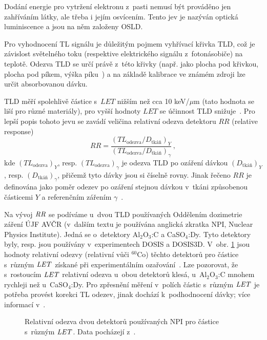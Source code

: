 Dodání energie pro vytržení elektronu z~pasti nemusí být prováděno jen zahříváním látky, ale třeba i jejím osvícením. Tento jev je nazýván optická luminiscence a jsou na něm založeny OSLD.

Pro vyhodnocení TL signálu je důležitým pojmem vyhřívací křivka TLD, což je závislost světelného toku (respektive elektrického signálu z~fotonásobiče) na teplotě. Odezva TLD se určí právě z~této křivky (např. jako plocha pod křivkou, plocha pod píkem, výška píku~\cite{dosis}) a na základě kalibrace ve známém zdroji lze určit absorbovanou dávku.

TLD měří spolehlivě částice s~$\mathit{LET}$ nižším než cca 10 keV/$\mu$m (tato hodnota se liší pro různé materiály), pro vyšší hodnoty $\mathit{LET}$ se účinnost TLD snižuje~\cite{passDetectors}. Pro lepší popis tohoto jevu se zavádí veličina relativní odezva detektoru $\mathit{RR}$ (relative response)
\begin{equation}
  \mathit{RR}=\frac{\left(TL_{\text{odezva}}/D_{\text{tkáň}}\right)_Y}{\left(TL_{\text{odezva}}/D_{\text{tkáň}}\right)_{\gamma}}\,,
  \label{eq:detektory_TLD_RR}
\end{equation}
kde $(TL_{\text{odezva}})_Y$, resp. $(TL_{\text{odezva}})_{\gamma}$ je odezva TLD po ozáření dávkou $(D_{\text{tkáň}})_Y$, resp. $(D_{\text{tkáň}})_{\gamma}$, přičemž tyto dávky jsou si číselně rovny. Jinak řečeno $\mathit{RR}$ je definována jako poměr odezev po ozáření stejnou dávkou v~tkáni způsobenou částicemi $Y$ a referenčním zářením $\gamma$~\cite{TLD_RR}. 

Na vývoj $\mathit{RR}$ se podíváme u~dvou TLD používaných Oddělením dozimetrie záření ÚJF AVČR (v~dalším textu je používána anglická zkratka NPI, Nuclear Physics Institute). Jedná se o~detektory Al$_2$O$_3$:C a CaSO$_4$:Dy. Tyto detektory byly, resp. jsou používány v~experimentech DOSIS a DOSIS3D. V~obr. \ref{fig:detektory_TLD_RR} jsou hodnoty relativní odezvy (relativní vůči $^{60}$Co) těchto detektorů pro částice s~různým $\mathit{LET}$ získané při experimentálním ozařování~\cite{dataTLD_RR}. Lze pozorovat, že s~rostoucím $\mathit{LET}$ relativní odezva u~obou detektorů klesá, u~Al$_2$O$_3$:C mnohem rychleji než u~CaSO$_4$:Dy. Pro zpřesnění měření v~polích částic s~různým $\mathit{LET}$ je potřeba provést korekci TL odezev, jinak dochází k~podhodnocení dávky; více informací v~\cite{TLD_RR}.
\begin{figure}[H]
  \centering
  
  \caption{Relativní odezva dvou detektorů používaných NPI pro částice s~různým $\mathit{LET}$. Data pocházejí z~\cite{dataTLD_RR}.}
  \label{fig:detektory_TLD_RR}
\end{figure}
